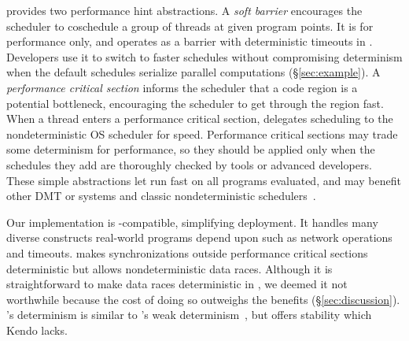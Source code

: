 

\xxx provides two performance hint abstractions.  A \emph{soft
  barrier} encourages the scheduler to coschedule a group of threads at
given program points.  It is for performance only, and operates as a
barrier with deterministic timeouts in \xxx.  Developers use it to switch
to faster schedules without compromising determinism
when the default schedules serialize parallel
computations (\S\ref{sec:example}).  A \emph{performance critical section}
informs the scheduler that a code region is a potential
bottleneck, encouraging the scheduler to get through the region fast.
When a thread enters a performance critical section, \xxx delegates scheduling to the
nondeterministic OS scheduler for speed.  
Performance critical sections may trade some determinism for
performance, so they should be applied only when the schedules they add
are thoroughly checked by tools or advanced developers.
These simple abstractions
let \xxx run fast on all programs evaluated, and
may benefit other DMT or \smt systems and classic nondeterministic
schedulers~\cite{coschedule:sigmetrics96, coschedule, partial-barrier:atc06}.


Our \xxx implementation is \pthread-compatible, simplifying deployment.
It handles many diverse constructs real-world programs depend upon such as
network operations and timeouts.  \xxx makes synchronizations outside
performance critical sections deterministic but allows nondeterministic
data races.  Although it is
straightforward to make data races deterministic in \xxx,
we deemed it not worthwhile because the cost of doing so outweighs the
benefits (\S\ref{sec:discussion}).  \xxx's determinism is similar to
\kendo's weak determinism~\cite{kendo:asplos09}, but \xxx offers stability
which Kendo lacks.

